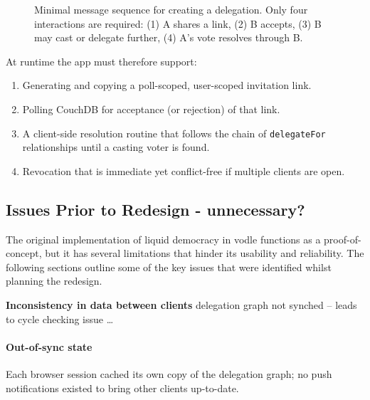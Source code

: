 \begin{figure}[H]
  \centering
  \caption{Minimal message sequence for creating a delegation. Only four interactions are required: (1) A shares a link, (2) B accepts, (3) B may cast or delegate further, (4) A's vote resolves through B.}
  \label{fig:delegation-flow}
\end{figure}

At runtime the app must therefore support:
\begin{enumerate}
  \item Generating and copying a poll-scoped, user-scoped invitation link.
  \item Polling CouchDB for acceptance (or rejection) of that link.
  \item A client-side resolution routine that follows the chain of \texttt{delegateFor} relationships until a casting voter is found.
  \item Revocation that is immediate yet conflict-free if multiple clients are open.
\end{enumerate}

\subsection{Issues Prior to Redesign - unnecessary?}
The original implementation of liquid democracy in vodle functions as a proof-of-concept, but it has several limitations that hinder its usability and reliability. The following sections outline some of the key issues that were identified whilst planning the redesign.

\textbf{Inconsistency in data between clients} delegation graph not synched -- leads to cycle checking issue \dots

\paragraph{Out-of-sync state} Each browser session cached its own copy of the delegation graph; no push notifications existed to bring other clients up-to-date.
